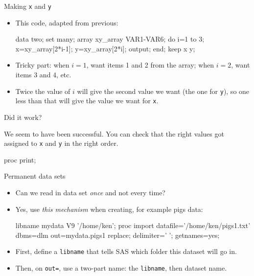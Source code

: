\documentclass[unknownkeysallowed]{beamer}\usepackage[]{graphicx}\usepackage[]{color}
\begin{document}
\begin{frame}[fragile]{Making \texttt{x} and \texttt{y}}

  \begin{itemize}
  \item This code, adapted from previous:
        \begin{Datastep}
data two;
  set many;
  array xy_array VAR1-VAR6;
  do i=1 to 3;
    x=xy_array[2*i-1];
    y=xy_array[2*i];
    output;
  end;
  keep x y;
  \end{Datastep}
  
  \item Tricky part: when $i=1$, want items 1 and 2 from the array;
    when $i=2$, want items 3 and 4, etc. 
  \item Twice the value of $i$ will
    give the second value we want (the one for \texttt{y}), so one
    less than that will give the value we want for \texttt{x}.

  \end{itemize}

  
  
\end{frame}

\begin{frame}[fragile]{Did it work?}
  
      We seem to have been successful. You can check that the right values
  got assigned to \texttt{x} and \texttt{y} in the right order.

  
  \begin{Sascode}[store=mc]
proc print;    
  \end{Sascode}
  

\end{frame}

\begin{frame}[fragile]{Permanent data sets}
  \begin{itemize}
  \item Can we read in data set \emph{once} and not every time?
  \item Yes, use \emph{this mechanism} when creating, for
    example pigs data:

\begin{Datastep}
libname mydata V9 '/home/ken';
proc import
  datafile='/home/ken/pigs1.txt'
    dbms=dlm 
    out=mydata.pigs1
    replace;
  delimiter=' ';
  getnames=yes;
\end{Datastep}

\item First, define a \texttt{libname} that tells SAS which folder
  this dataset will go in.
\item Then, on \texttt{out=}, use a two-part name: the
  \texttt{libname}, then dataset name.


  \end{itemize}
\end{frame}
\end{document}
